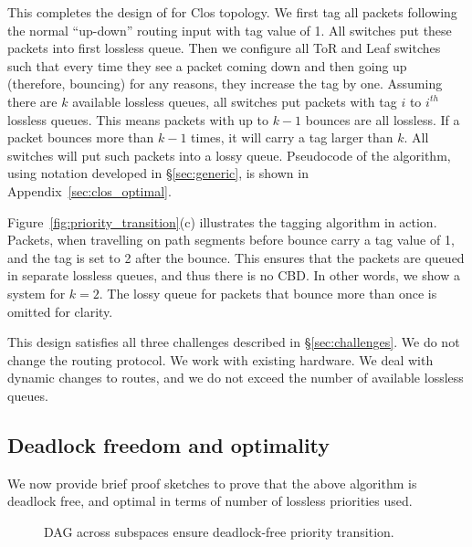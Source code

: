 This completes the design of \sysname{} for Clos topology.  We first tag all
packets following the normal ``up-down'' routing input with tag value of 1. All
switches put these packets into first lossless queue. Then we configure all ToR
and Leaf switches such that every time they see a packet coming down and then
going up (therefore, bouncing) for any reasons, they increase the tag by one.
Assuming there are $k$ available lossless queues, all switches put packets with
tag $i$ to $i^{th}$ lossless queues. This means packets with up to $k-1$ bounces
are all lossless. If a packet bounces more than $k-1$ times, it will carry a tag
larger than $k$. All switches will put such packets into a lossy queue.
Pseudocode of the algorithm, using notation developed in \S\ref{sec:generic}, is
shown in Appendix~\ref{sec:clos_optimal}.

Figure~\ref{fig:priority_transition}(c) illustrates the tagging algorithm in
action.  Packets, when travelling on path segments before bounce carry a tag
value of 1, and the tag is set to 2 after the bounce. This ensures that the
packets are queued in separate lossless queues, and thus there is no CBD. In
other words, we show a system for $k=2$. The lossy queue for packets that bounce
more than once is omitted for clarity. 

This design satisfies all three challenges described in
\S\ref{sec:challenges}. We do not change the routing protocol. We work with
existing hardware. We deal with dynamic changes to routes, and we do not exceed
the number of available lossless queues.

\subsection {Deadlock freedom and optimality}
\label{subsec:specific_deadlock_free}

We now provide brief proof sketches to prove that the above algorithm is
deadlock free, and optimal in terms of number of lossless priorities used.

\begin{figure}[t]
	\centering
	
	
	\caption{DAG across subspaces ensure deadlock-free priority transition.}\label{fig:subspace}
\end{figure}

